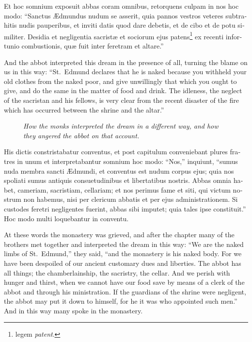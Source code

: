 \documentclass{book}
\newcommand{\blockhead}[4][]{
\begin{figure}
\centering
\vspace{#4}
\parbox{2.75cm}{\begin{center}\footnotesize \color{BrickRed} \emph{#2}\\ #1 \end{center}}
\end{figure}
}
\begin{document}
\begin{paracol}{2}
\switchcolumn*

\begin{otherlanguage}{latin}
Et hoc somnium exposuit abbas coram omnibus, retorquens culpam in nos hoc modo: ``Sanctus \AE{}dmundus nudum se asserit, quia pannos vestros veteres subtrahitis nudis pauperibus, et inviti datis quod dare debetis, et de cibo et de potu similiter. Desidia et negligentia sacrist\ae{} et sociorum ejus patens\footnote[\textdagger]{legem \emph{patent}.} ex recenti infortunio combustionis, qu\ae{} fuit inter feretram et altare.''
\end{otherlanguage}

\switchcolumn

And the abbot interpreted this dream in the presence of all, turning the blame on us in this way: ``St.\ Edmund declares that he is naked because you withheld your old clothes from the naked poor, and give unwillingly that which you ought to give, and do the same in the matter of food and drink. The idleness, the neglect of the sacristan and his fellows, is very clear from the recent disaster of the fire which has occurred between the shrine and the altar.''

\switchcolumn*

\begin{otherlanguage}{latin}
\blockhead{How the monks interpreted the dream in a different way, and how they angered the abbot on that account.}{4}{-.65cm}
His dictis constristabatur conventus, et post capitulum conveniebant plures fratres in unum et interpretabantur somnium hoc modo: ``Nos,'' inquiunt, ``sumus nuda membra sancti \AE{}dmundi, et conventus est nudum corpus ejus; quia nos spoliati sumus antiquis consuetudinibus et libertatibus nostris. Abbas omnia habet, cameriam, sacristiam, cellariam; et nos perimus fame et siti, qui victum nostrum non habemus, nisi per clericum abbatis et per ejus administrationem. Si custodes feretri negligentes fuerint, abbas sibi imputet; quia tales ipse constituit.'' Hoc modo multi loquebantur in conventu.

\end{otherlanguage}

\switchcolumn

At these words the monastery was grieved, and after the chapter many of the brothers met together and interpreted the dream in this way: ``We are the naked limbs of St.\ Edmund,'' they said, ``and the monastery is his naked body. For we have been despoiled of our ancient customary dues and liberties. The abbot has all things; the chamberlainship, the sacristry, the cellar. And we perish with hunger and thirst, when we cannot have our food save by means of a clerk of the abbot and through his ministration. If the guardians of the shrine were negligent, the abbot may put it down to himself, for he it was who appointed such men.'' And in this way many spoke in the monastery.


\end{paracol}
\end{document}
